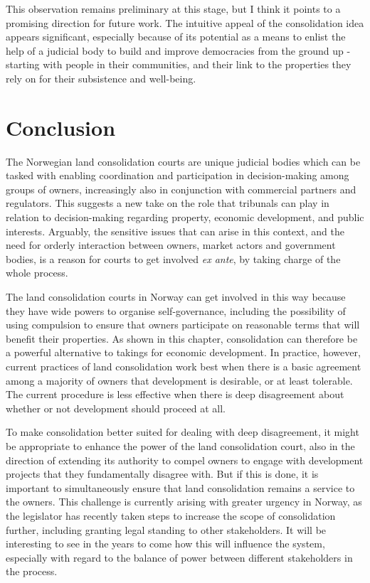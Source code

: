 This observation remains preliminary at this stage, but I think it points to a promising direction for future work. The intuitive appeal of the consolidation idea appears significant, especially because of its potential as a means to enlist the help of a judicial body to build and improve democracies from the ground up - starting with people in their communities, and their link to the properties they rely on for their subsistence and well-being.

\section{Conclusion}\label{sec:6:6}

The Norwegian land consolidation courts are unique judicial bodies which can be tasked with enabling coordination and participation in decision-making among groups of owners, increasingly also in conjunction with commercial partners and regulators. This suggests a new take on the role that tribunals can play in relation to decision-making regarding property, economic development, and public interests. Arguably, the sensitive issues that can arise in this context, and the need for orderly interaction between owners, market actors and government bodies, is a reason for courts to get involved {\it ex ante}, by taking charge of the whole process.

The land consolidation courts in Norway can get involved in this way because they have wide powers to organise self-governance, including the possibility of using compulsion to ensure that owners participate on reasonable terms that will benefit their properties. As shown in this chapter, consolidation can therefore be a powerful alternative to takings for economic development. In practice, however, current practices of land consolidation work best when there is a basic agreement among a majority of owners that development is desirable, or at least tolerable. The current procedure is less effective when there is deep disagreement about whether or not development should proceed at all.

To make consolidation better suited for dealing with deep disagreement, it might be appropriate to enhance the power of the land consolidation court, also in the direction of extending its authority to compel owners to engage with development projects that they fundamentally disagree with. But if this is done, it is important to simultaneously ensure that land consolidation remains a service to the owners. This challenge is currently arising with greater urgency in Norway, as the legislator has recently taken steps to increase the scope of consolidation further, including granting legal standing to other stakeholders. It will be interesting to see in the years to come how this will influence the system, especially with regard to the balance of power between different stakeholders in the process.

